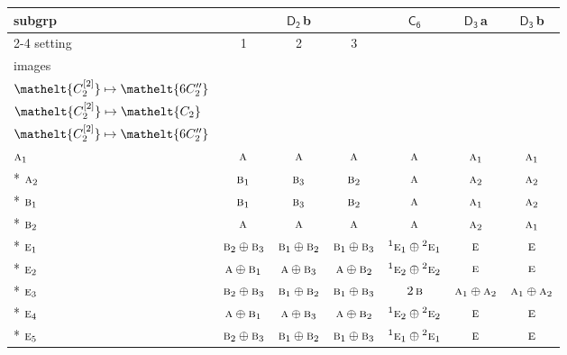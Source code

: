 \documentclass[10pt,a4paper]{article}
\numberwithin{equation}{section}
\newcommand{\eltfont}[1]{{\let\sigma\eltsigma\mathelt{#1}}}
\newcommand{\grp}[1]{\mathsf{#1}}
\newcommand{\irr}[1]{\text{\normalfont\scshape #1}}
\newcommand{\conjpair}[1]{{}^{#1}}
\newcommand{\cls}[1]{\eltfont{#1}}
\newcommand{\clsletter}[1]{\,{\scriptsize\color{black!55}#1}}
\newcommand{\genidx}[2]{#1^{[\mathrm{#2}]}}
\begin{document}
{\small\begin{longtable}{@{}lcccccc@{}}\toprule
subgrp & \multicolumn{3}{c}{\href{D2.pdf}{$\grp{D_{2}}$}\clsletter{b}} & \href{C6.pdf}{$\grp{C_{6}}$} & \href{D3.pdf}{$\grp{D_{3}}$}\clsletter{a} & \href{D3.pdf}{$\grp{D_{3}}$}\clsletter{b}\\\cmidrule(lr){2-4}
setting & 1 & 2 & 3 &  &  & \\
images & {\scriptsize\begin{tabular}[t]{@{}c@{}}$\cls{\genidx{C_{2}}{1}} \mapsto \cls{C_{2}}$\\$\cls{\genidx{C_{2}}{2}} \mapsto \cls{6C_{2}''}$\end{tabular}} & {\scriptsize\begin{tabular}[t]{@{}c@{}}$\cls{\genidx{C_{2}}{1}} \mapsto \cls{6C_{2}''}$\\$\cls{\genidx{C_{2}}{2}} \mapsto \cls{C_{2}}$\end{tabular}} & {\scriptsize\begin{tabular}[t]{@{}c@{}}$\cls{\genidx{C_{2}}{1}} \mapsto \cls{6C_{2}''}$\\$\cls{\genidx{C_{2}}{2}} \mapsto \cls{6C_{2}''}$\end{tabular}} &  &  & \\\midrule\endhead
\bottomrule\endfoot\endlastfoot
$\irr{a}_{1}$ & $\irr{a}$ & $\irr{a}$ & $\irr{a}$ & $\irr{a}$ & $\irr{a}_{1}$ & $\irr{a}_{1}$\\*
$\irr{a}_{2}$ & $\irr{b}_{1}$ & $\irr{b}_{3}$ & $\irr{b}_{2}$ & $\irr{a}$ & $\irr{a}_{2}$ & $\irr{a}_{2}$\\*
$\irr{b}_{1}$ & $\irr{b}_{1}$ & $\irr{b}_{3}$ & $\irr{b}_{2}$ & $\irr{a}$ & $\irr{a}_{1}$ & $\irr{a}_{2}$\\*
$\irr{b}_{2}$ & $\irr{a}$ & $\irr{a}$ & $\irr{a}$ & $\irr{a}$ & $\irr{a}_{2}$ & $\irr{a}_{1}$\\*
$\irr{e}_{1}$ & $\irr{b}_{2}\oplus \irr{b}_{3}$ & $\irr{b}_{1}\oplus \irr{b}_{2}$ & $\irr{b}_{1}\oplus \irr{b}_{3}$ & $\conjpair{1}\irr{e}_{1}\oplus \conjpair{2}\irr{e}_{1}$ & $\irr{e}$ & $\irr{e}$\\*
$\irr{e}_{2}$ & $\irr{a}\oplus \irr{b}_{1}$ & $\irr{a}\oplus \irr{b}_{3}$ & $\irr{a}\oplus \irr{b}_{2}$ & $\conjpair{1}\irr{e}_{2}\oplus \conjpair{2}\irr{e}_{2}$ & $\irr{e}$ & $\irr{e}$\\*
$\irr{e}_{3}$ & $\irr{b}_{2}\oplus \irr{b}_{3}$ & $\irr{b}_{1}\oplus \irr{b}_{2}$ & $\irr{b}_{1}\oplus \irr{b}_{3}$ & $2\,\irr{b}$ & $\irr{a}_{1}\oplus \irr{a}_{2}$ & $\irr{a}_{1}\oplus \irr{a}_{2}$\\*
$\irr{e}_{4}$ & $\irr{a}\oplus \irr{b}_{1}$ & $\irr{a}\oplus \irr{b}_{3}$ & $\irr{a}\oplus \irr{b}_{2}$ & $\conjpair{1}\irr{e}_{2}\oplus \conjpair{2}\irr{e}_{2}$ & $\irr{e}$ & $\irr{e}$\\*
$\irr{e}_{5}$ & $\irr{b}_{2}\oplus \irr{b}_{3}$ & $\irr{b}_{1}\oplus \irr{b}_{2}$ & $\irr{b}_{1}\oplus \irr{b}_{3}$ & $\conjpair{1}\irr{e}_{1}\oplus \conjpair{2}\irr{e}_{1}$ & $\irr{e}$ & $\irr{e}$\\
\bottomrule\end{longtable}}
\end{document}
